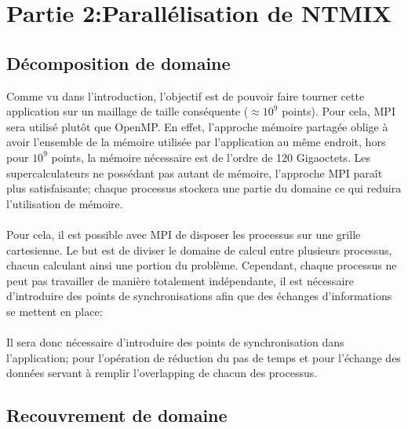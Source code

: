 \section{Partie 2:Parallélisation de NTMIX}

\subsection{Décomposition de domaine}
Comme vu dans l'introduction, l'objectif est de pouvoir faire tourner cette application sur un maillage de taille conséquente ($\approx 10^9$ points). Pour cela, MPI sera utilisé plutôt que OpenMP. En effet, l'approche mémoire partagée oblige à avoir l'ensemble de la mémoire utilisée par l'application au même endroit, hors pour $10^9$ points, la mémoire nécessaire est de l'ordre de 120 Gigaoctets. Les supercalculateurs ne possédant pas autant de mémoire, l'approche MPI paraît plus satisfaisante; chaque processus stockera une partie du domaine ce qui reduira l'utilisation de mémoire.

\paragraph{}Pour cela, il est possible avec MPI de disposer les processus sur une grille cartesienne.
Le but est de diviser le domaine de calcul entre plusieurs processus, chacun calculant ainsi une portion du problème. Cependant, chaque processus ne peut pas travailler de manière totalement indépendante, il est nécessaire d'introduire des points de synchronisations afin que des échanges d'informations se mettent en place: 

\paragraph{}Il sera donc nécessaire d'introduire des points de synchronisation dans l'application; pour l'opération de réduction du pas de temps et pour l'échange des données servant à remplir l'overlapping de chacun des processus.

\subsection{Recouvrement de domaine}
